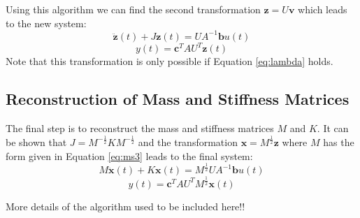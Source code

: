 \documentclass{mbd_fullpaper}
\begin{document}
Using this algorithm we can find the second transformation $\mathbf{z} = U \mathbf{v}$ which leads to the new system:
\begin{equation}
\ddot{\mathbf{z}}(t) + J \mathbf{z}(t) =   U A^{-1} \mathbf{b} u(t)
\label{eq:jacobi1}
\end{equation}
\begin{equation}
y(t) = \mathbf{c}^T  A U^T \mathbf{z}(t)
\label{eq:jacobi2}
\end{equation}
Note that this transformation is only possible if Equation \ref{eq:lambda} holds.

\subsection{Reconstruction of Mass and Stiffness Matrices}
\label{sec:choiceai}
The final step is to reconstruct the mass and stiffness matrices $M$ and $K$.
It can be shown that $J =  M^{-\frac{1}{2}} K M^{-\frac{1}{2}}$ and the transformation $\mathbf{x} = M^{\frac{1}{2}} \mathbf{z}$ where $M$ has the form given in Equation \ref{eq:ms3} leads to the final system:
\begin{equation}
M \ddot{\mathbf{x}}(t) + K \mathbf{x}(t) = M^{\frac{1}{2}} U A^{-1} \mathbf{b} u(t)
\label{eq:fin1}
\end{equation}
\begin{equation}
y(t) = \mathbf{c}^T  A U^T M^{\frac{1}{2}}\mathbf{x}(t)
\label{eq:fin2}
\end{equation}

More details of the algorithm used to be included here!!
\end{document}
